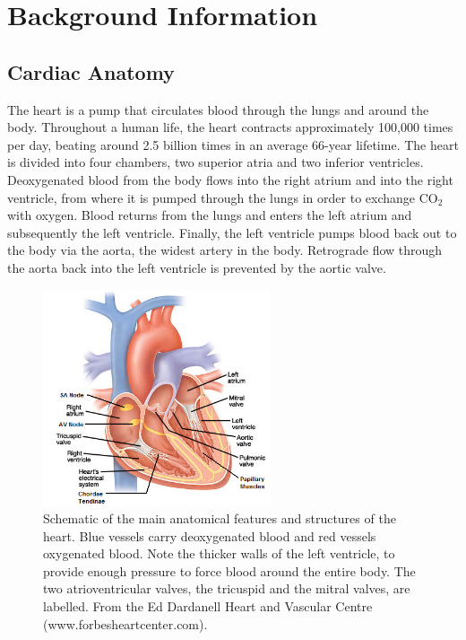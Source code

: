 \chapter{Background Information}
\dblspace
\begin{quote}{\em }\end{quote}

\section{Cardiac Anatomy}
  The heart is a pump that circulates blood through the lungs and around the body. Throughout a human life, the heart contracts approximately 100,000 times per day, beating around 2.5 billion times in an average 66-year lifetime. The heart is divided into four chambers, two superior atria and two inferior ventricles. Deoxygenated blood from the body flows into the right atrium and into the right ventricle, from where it is pumped through the lungs in order to exchange CO$_2$ with oxygen. Blood returns from the lungs and enters the left atrium and subsequently the left ventricle. Finally, the left ventricle pumps blood back out to the body via the aorta, the widest artery in the body. Retrograde flow through the aorta back into the left ventricle is prevented by the aortic valve.
  
  \begin{figure}[htbp]
    \centering
    \includegraphics[width=0.6\textwidth]{Ch2/Figs/interior_heart_anatomy}
    \caption{Schematic of the main anatomical features and structures of the heart. Blue vessels carry deoxygenated blood and red vessels oxygenated blood. Note the thicker walls of the left ventricle, to provide enough pressure to force blood around the entire body. The two atrioventricular valves, the tricuspid and the mitral valves, are labelled. From the Ed Dardanell Heart and Vascular Centre (www.forbesheartcenter.com).}
    \label{fig:heart}
  \end{figure}  

